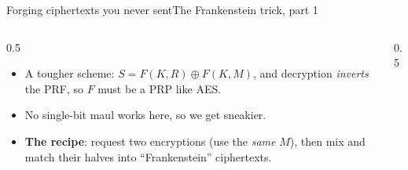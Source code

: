 \ifdefined\PRESENTATION\else\PassOptionsToClass{handout}{beamer}\fi\documentclass[aspectratio=169, lualatex]{beamer}
\begin{document}
\begin{frame}{Forging ciphertexts you never sent}{The Frankenstein trick, part 1}
	\begin{columns}[c]
		\begin{column}{0.5\textwidth}
			\begin{itemize}
				\item A tougher scheme: $S = F(K, R) \oplus F(K, M)$, and decryption \emph{inverts} the PRF, so $F$ must be a PRP like AES.
				\item No single-bit maul works here, so we get sneakier.
				\item \textbf{The recipe}: request two encryptions (use the \emph{same} $M$), then mix and match their halves into ``Frankenstein'' ciphertexts.
			\end{itemize}
		\end{column}
		\begin{column}{0.5\textwidth}
		\end{column}
	\end{columns}
\end{frame}
\end{document}
